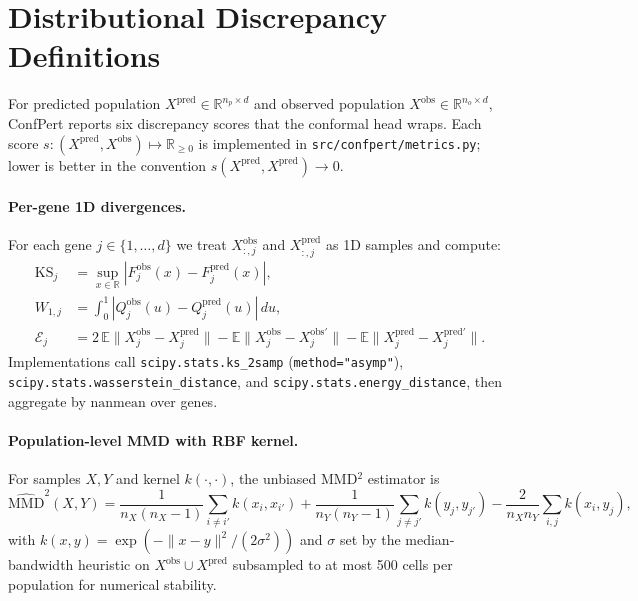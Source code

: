 \documentclass{article}
\begin{document}
\section{Distributional Discrepancy Definitions}
\label{app:metrics}

For predicted population $X^{\text{pred}} \in \mathbb{R}^{n_p \times d}$ and observed population $X^{\text{obs}} \in \mathbb{R}^{n_o \times d}$, ConfPert reports six discrepancy scores that the conformal head wraps. Each score $s \colon (X^{\text{pred}}, X^{\text{obs}}) \mapsto \mathbb{R}_{\geq 0}$ is implemented in \texttt{src/confpert/metrics.py}; lower is better in the convention $s(X^{\text{pred}}, X^{\text{pred}}) \to 0$.

\paragraph{Per-gene 1D divergences.} For each gene $j \in \{1, \dots, d\}$ we treat $X^{\text{obs}}_{:, j}$ and $X^{\text{pred}}_{:, j}$ as 1D samples and compute:
\begin{align*}
\mathrm{KS}_j     &= \sup_{x \in \mathbb{R}} |F^{\text{obs}}_j(x) - F^{\text{pred}}_j(x)|, \\
W_{1, j}          &= \int_0^1 |Q^{\text{obs}}_j(u) - Q^{\text{pred}}_j(u)|\, du, \\
\mathcal{E}_j     &= 2\,\mathbb{E}\|X^{\text{obs}}_j - X^{\text{pred}}_j\|
                     - \mathbb{E}\|X^{\text{obs}}_j - X^{\text{obs}'}_j\|
                     - \mathbb{E}\|X^{\text{pred}}_j - X^{\text{pred}'}_j\|.
\end{align*}
Implementations call \texttt{scipy.stats.ks\_2samp} (\texttt{method="asymp"}), \texttt{scipy.stats.wasserstein\_distance}, and \texttt{scipy.stats.energy\_distance}, then aggregate by $\mathrm{nanmean}$ over genes.

\paragraph{Population-level MMD with RBF kernel.} For samples $X, Y$ and kernel $k(\cdot, \cdot)$, the unbiased MMD$^2$ estimator is
\begin{equation*}
\widehat{\mathrm{MMD}}^2(X, Y) = \frac{1}{n_X(n_X{-}1)} \sum_{i \neq i'} k(x_i, x_{i'}) + \frac{1}{n_Y(n_Y{-}1)} \sum_{j \neq j'} k(y_j, y_{j'}) - \frac{2}{n_X n_Y} \sum_{i, j} k(x_i, y_j),
\end{equation*}
with $k(x, y) = \exp(-\|x - y\|^2 / (2 \sigma^2))$ and $\sigma$ set by the median-bandwidth heuristic on $X^{\text{obs}} \cup X^{\text{pred}}$ subsampled to at most 500 cells per population for numerical stability.
\end{document}

